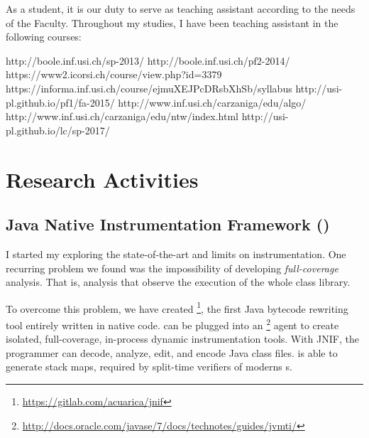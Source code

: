 As a \phd{} student, it is our duty to serve as teaching assistant according to the needs of the Faculty.
Throughout my \phd{} studies, I have been teaching assistant in the following courses:

\begin{tas}
	{http://boole.inf.usi.ch/sp-2013/}
	{http://boole.inf.usi.ch/pf2-2014/}
	{https://www2.icorsi.ch/course/view.php?id=3379}
	{https://informa.inf.usi.ch/course/ejmuXEJPcDRsbXhSb/syllabus}
	{http://usi-pl.github.io/pf1/fa-2015/}
	{http://www.inf.usi.ch/carzaniga/edu/algo/}
	{http://www.inf.usi.ch/carzaniga/edu/ntw/index.html}
	{http://usi-pl.github.io/lc/sp-2017/}
\end{tas}

\section{Research Activities}

\subsection*{Java Native Instrumentation Framework (\jnif{})}

I started my \phd{} exploring the state-of-the-art and limits on \java{} instrumentation.
One recurring problem we found was the impossibility of developing \emph{full-coverage} analysis.
That is, analysis that observe the execution of the whole \java{} class library.

To overcome this problem, we have created \jnif{}\footnote{\url{https://gitlab.com/acuarica/jnif}}, the first Java bytecode rewriting tool entirely written in native code.
\jnif{} can be plugged into an \jvmti{}\footnote{\url{http://docs.oracle.com/javase/7/docs/technotes/guides/jvmti/}} agent to create isolated, full-coverage, in-process dynamic instrumentation tools.
With JNIF, the programmer can decode, analyze, edit, and encode Java class files.
\jnif{} is able to generate stack maps, required by split-time verifiers of moderns \jvm{}s.


